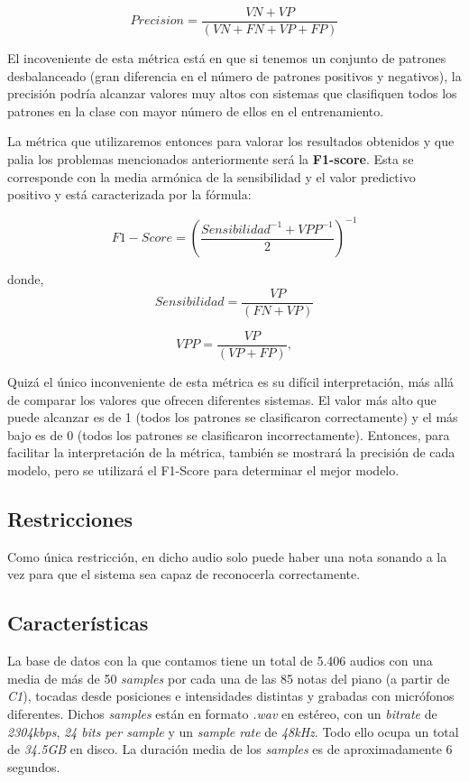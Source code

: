 \documentclass[12pt]{article}
\begin{document}
\begin{equation}
	Precision = \frac{VN + VP}{(VN + FN + VP + FP)}
\end{equation}

\smallskip
El incoveniente de esta métrica está en que si tenemos un conjunto de patrones desbalanceado (gran diferencia en el número de
patrones positivos y negativos), la precisión podría alcanzar valores muy altos con sistemas que clasifiquen todos los patrones en la clase con mayor número de ellos
en el entrenamiento.

\bigskip
La métrica que utilizaremos entonces para valorar los resultados obtenidos y que palia los problemas
mencionados anteriormente será la \textbf{F1-score}. Esta se corresponde con la media armónica de la sensibilidad y el
valor predictivo positivo y está caracterizada por la fórmula: 

\begin{equation}
	F1-Score = \left(\frac{Sensibilidad^{-1} + VPP^{-1}}{2}\right)^{-1}
\end{equation}

donde, 
\begin{equation}
	Sensibilidad = \frac{VP}{(FN + VP)}
\end{equation}

\begin{equation}
	VPP = \frac{VP}{(VP + FP)}, 
\end{equation}

\smallskip
Quizá el único inconveniente de esta métrica es su difícil interpretación, más allá de comparar los valores que ofrecen diferentes sistemas.
El valor más alto que puede alcanzar es de 1 (todos los patrones se clasificaron correctamente) y el más bajo es de 0 (todos los patrones se clasificaron
incorrectamente). Entonces, para facilitar la interpretación de la métrica, también se mostrará la precisión de cada modelo, pero se utilizará
el F1-Score para determinar el mejor modelo.

\subsection{Restricciones}
\bigskip
Como única restricción, en dicho audio solo puede haber una nota sonando a la vez para que el sistema sea capaz de reconocerla correctamente.

\subsection{Características}
\bigskip
La base de datos con la que contamos tiene un total de 5.406 audios con una media de más de 50 \textit{samples} por cada una de las 85 notas del piano (a partir de \textit{C1}), tocadas
desde posiciones e intensidades distintas y grabadas con micrófonos diferentes. Dichos \textit{samples} están en formato \textit{.wav} en estéreo, con un 
\textit{bitrate} de \textit{2304kbps}, \textit{24 bits per sample} y un \textit{sample rate} de \textit{48kHz}. Todo ello ocupa un total de \textit{34.5GB} en disco.
La duración media de los \textit{samples} es de aproximadamente 6 segundos.
\end{document}
